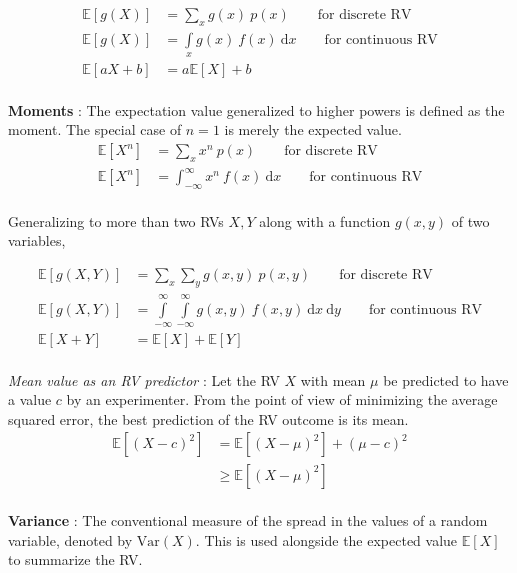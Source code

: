 \begin{align}
	\mathbb{E}[g(X)] &= \sum\limits_{x} g(x)\ p(x)  \qquad \text{for discrete RV} \\
	\mathbb{E}[g(X)] &= \int\limits_{x} g(x)\ f(x)\ \mathrm{d}x  \qquad \text{for continuous RV} \\
	\mathbb{E}[aX + b] &= a \mathbb{E}[X] + b \nonumber
\end{align}\\

\textbf{Moments} : The expectation value generalized to higher powers is defined as the moment. The special case of $ n = 1 $ is merely the expected value. \\

\begin{align}
	\mathbb{E}[X^n] &= \sum_{x} x^n\ p(x) \qquad \text{for discrete RV} \\
	\mathbb{E}[X^n] &= \int_{-\infty}^{\infty} x^n\ f(x)\ \mathrm{d}x \qquad \text{for continuous RV}
\end{align} \\

Generalizing to more than two RVs $ X, Y $ along with a function $ g(x,y) $ of two variables,

\begin{align}
	\mathbb{E}[g(X, Y)] &= \sum\limits_{x} \sum\limits_{y} g(x, y)\ p(x, y)  \qquad \text{for discrete RV} \\
	\mathbb{E}[g(X, Y)] &= \int\limits_{-\infty}^{\infty} \int\limits_{-\infty}^{\infty} g(x, y)\ f(x, y)\ \mathrm{d}x \ \mathrm{d}y  \qquad \text{for continuous RV} \\
	\mathbb{E}[X + Y] &= \mathbb{E}[X] + \mathbb{E}[Y] \nonumber
\end{align} \\

\textit{Mean value as an RV predictor} : Let the RV $ X $ with mean $ \mu $ be predicted to have a value $ c $ by an experimenter. From the point of view of minimizing the average squared error, the best prediction of the RV outcome is its mean.\\

\begin{align}
	\mathbb{E}[(X - c)^2] &= \mathbb{E}[(X - \mu)^2] + (\mu - c)^2 \nonumber \\
	&\geq \mathbb{E}[(X - \mu)^2] 
\end{align} \\

\textbf{Variance} : The conventional measure of the spread in the values of a random variable, denoted by $ \mathrm{Var}(X) $. This is used alongside the expected value $ \mathbb{E}[X] $ to summarize the RV. \\

